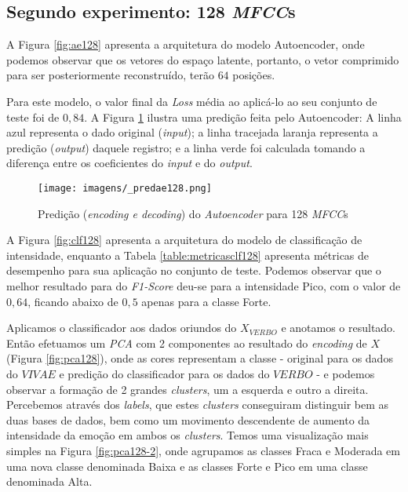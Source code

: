 \subsection{Segundo experimento: 128 \textit{MFCC}s}

A Figura \ref{fig:ae128} apresenta a arquitetura do modelo Autoencoder, onde podemos observar que os vetores do espaço latente, portanto, o vetor comprimido para ser posteriormente reconstruído, terão $64$ posições.

Para este modelo, o valor final da \textit{Loss} média ao aplicá-lo ao seu conjunto de teste foi de $0,84$. A Figura \ref{fig:predae128} ilustra uma predição feita pelo Autoencoder: A linha azul representa o dado original (\textit{input}); a linha tracejada laranja representa a predição (\textit{output}) daquele registro; e a linha verde foi calculada tomando a diferença entre os coeficientes do \textit{input} e do \textit{output}.

    \begin{figure}[t]
    \centering
    \texttt{[image: imagens/\_predae128.png]}
    \caption{\label{fig:predae128}Predição (\textit{encoding e decoding}) do \textit{Autoencoder} para 128 \textit{MFCC}s}
\end{figure}

A Figura \ref{fig:clf128} apresenta a arquitetura do modelo de classificação de intensidade, enquanto a Tabela \ref{table:metricasclf128} apresenta métricas de desempenho para sua aplicação no conjunto de teste. Podemos observar que o melhor resultado para do \textit{F1-Score} deu-se para a intensidade Pico, com o valor de $0,64$, ficando abaixo de $0,5$ apenas para a classe Forte.

Aplicamos o classificador aos dados oriundos do $X_{VERBO}$ e anotamos o resultado. Então efetuamos um \textit{PCA} com 2 componentes ao resultado do \textit{encoding} de $X$ (Figura \ref{fig:pca128}), onde as cores representam a classe - original para os dados do $VIVAE$ e predição do classificador para os dados do $VERBO$ - e podemos observar a formação de 2 grandes \textit{clusters}, um a esquerda e outro a direita. Percebemos através dos \textit{labels}, que estes \textit{clusters} conseguiram distinguir bem as duas bases de dados, bem como um movimento descendente de aumento da intensidade da emoção em ambos os \textit{clusters}. Temos uma visualização mais simples na Figura \ref{fig:pca128-2}, onde agrupamos as classes Fraca e Moderada em uma nova classe denominada Baixa e as classes Forte e Pico em uma classe denominada Alta.

